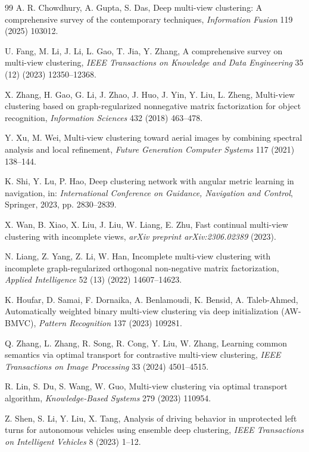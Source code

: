 \documentclass[11pt, a4paper]{article}
\begin{document}
\begin{thebibliography}{99}
A. R. Chowdhury, A. Gupta, S. Das, Deep multi-view clustering: A comprehensive survey of the contemporary techniques, \textit{Information Fusion} 119 (2025) 103012.

U. Fang, M. Li, J. Li, L. Gao, T. Jia, Y. Zhang, A comprehensive survey on multi-view clustering, \textit{IEEE Transactions on Knowledge and Data Engineering} 35 (12) (2023) 12350--12368.

X. Zhang, H. Gao, G. Li, J. Zhao, J. Huo, J. Yin, Y. Liu, L. Zheng, Multi-view clustering based on graph-regularized nonnegative matrix factorization for object recognition, \textit{Information Sciences} 432 (2018) 463--478.

Y. Xu, M. Wei, Multi-view clustering toward aerial images by combining spectral analysis and local refinement, \textit{Future Generation Computer Systems} 117 (2021) 138--144.

K. Shi, Y. Lu, P. Hao, Deep clustering network with angular metric learning in navigation, in: \textit{International Conference on Guidance, Navigation and Control}, Springer, 2023, pp. 2830--2839.

X. Wan, B. Xiao, X. Liu, J. Liu, W. Liang, E. Zhu, Fast continual multi-view clustering with incomplete views, \textit{arXiv preprint arXiv:2306.02389} (2023).

N. Liang, Z. Yang, Z. Li, W. Han, Incomplete multi-view clustering with incomplete graph-regularized orthogonal non-negative matrix factorization, \textit{Applied Intelligence} 52 (13) (2022) 14607--14623.

K. Houfar, D. Samai, F. Dornaika, A. Benlamoudi, K. Bensid, A. Taleb-Ahmed, Automatically weighted binary multi-view clustering via deep initialization (AW-BMVC), \textit{Pattern Recognition} 137 (2023) 109281.

Q. Zhang, L. Zhang, R. Song, R. Cong, Y. Liu, W. Zhang, Learning common semantics via optimal transport for contrastive multi-view clustering, \textit{IEEE Transactions on Image Processing} 33 (2024) 4501--4515.

R. Lin, S. Du, S. Wang, W. Guo, Multi-view clustering via optimal transport algorithm, \textit{Knowledge-Based Systems} 279 (2023) 110954.

Z. Shen, S. Li, Y. Liu, X. Tang, Analysis of driving behavior in unprotected left turns for autonomous vehicles using ensemble deep clustering, \textit{IEEE Transactions on Intelligent Vehicles} 8 (2023) 1--12.


\end{thebibliography}
\end{document}
